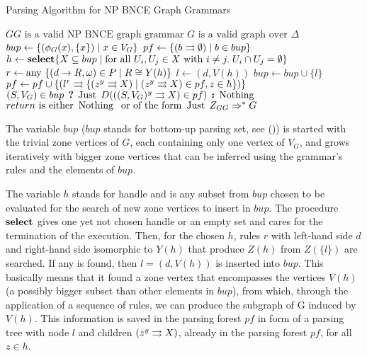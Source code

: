\documentclass[]{report}
\begin{document}
\begin{algorithm}[!h]
	\caption{Parsing Algorithm for NP BNCE Graph Grammars}
	\begin{algorithmic}[!ht]
		\Require $GG \text{ is a valid NP BNCE graph grammar}$
		\Require $G \text{ is a valid graph over } \Delta$ 
			\State $bup \gets \{(\phi_G(x),\{x\}) \; | \; x \in V_G\}$ 
			\State $pf \gets \{ \ptree{b}{}{\emptyset} \st b \in bup \}$ 
			\Repeat
				\State $h \gets \text{\textbf{select}} \{X \subseteq bup \; | \;\text{for all } U_i, U_j \in X \text{ with } i \neq j . \; U_i \cap U_j = \emptyset \}$
				 
					\State $r \gets \text{any } \{(d \to R,\omega) \in P \; | \; R \cong Y(h) \}$
					\State $l \gets (d,V(h))$
						\State $bup \gets bup \cup \{l\}$ 
						\State $pf \gets pf \cup \{ \ptree{l}{r}{\{\ptree{z}{y}{X} \st \ptree{z}{y}{X} \in pf, z \in h \}} \}$
					\EndIf
				\EndFor
			 
			\State \Return $(S, V_G) \in bup \? \Just D(\ptree{(S,V_G)}{y}{X} \in pf) \: \Nothing $
		\EndFunction
		\Ensure $return \text{ is either } \operatorname{\text{Nothing}}\; \text{ or of the form } \operatorname{\text{Just}}\; Z_{GG} \Rightarrow^*_{} G$
	\end{algorithmic}
	\label{alg:parse}
\end{algorithm}

The variable $bup$ ($bup$ stands for bottom-up parsing set, see ())%
is started with the trivial zone vertices of $G$, each containing only one vertex of $V_G$, and grows iteratively with bigger zone vertices that can be inferred using the grammar's rules and the elements of $bup$.

The variable $h$ stands for handle and is any subset from $bup$ chosen to be evaluated for the search of new zone vertices to insert in $bup$. The procedure $\textbf{select}$ gives one yet not chosen handle or an empty set and cares for the termination of the execution. Then, for the chosen $h$, rules $r$ with left-hand side $d$ and right-hand side isomorphic to $Y(h)$ that produce $Z(h)$ from $Z(\{l\})$ are searched. If any is found, then $l = (d,V(h))$ is inserted into $bup$. This basically means that it found a zone vertex that encompasses the vertices $V(h)$ (a possibly bigger subset than other elements in $bup$), from which, through the application of a sequence of rules, we can produce the subgraph of G induced by $V(h)$. This information is saved in the parsing forest $pf$ in form of a parsing tree with node $l$ and children $\ptree{z}{y}{X}$, already in the parsing forest $pf$, for all $z \in h$.
\end{document}

